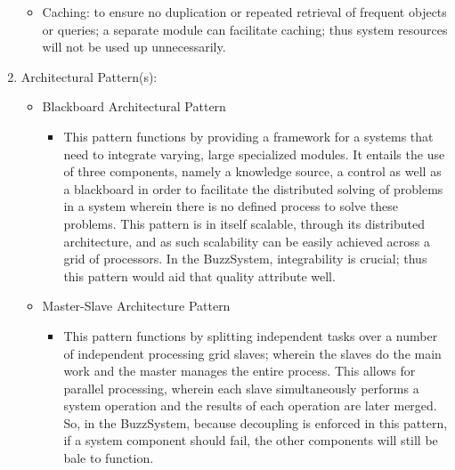 \begin{enumerate}
\begin{itemize}
			\item Caching: to ensure no duplication or repeated retrieval of frequent objects or queries; a separate module can facilitate caching; thus system resources will not be used up unnecessarily.
			 \end{itemize}
			\item Architectural Pattern(s):
			\begin{itemize}
			\item Blackboard Architectural Pattern
				\begin{itemize}
					\item This pattern functions by providing a framework for a systems that need to integrate varying, large specialized modules. It entails the use of three components, namely a knowledge source, a control as well as a blackboard in order to facilitate the distributed solving of problems in a system wherein there is no defined process to solve these problems. This pattern is in itself scalable, through its distributed architecture, and as such scalability can be easily achieved across a grid of processors. In the BuzzSystem, integrability is crucial; thus this pattern would aid that quality attribute well.				
			\end{itemize}
			 \end{itemize}
			 
			 \begin{itemize}
			\item Master-Slave Architecture Pattern
				\begin{itemize}
					\item This pattern functions by splitting independent tasks over a number of independent processing grid slaves; wherein the slaves do the main work and the master manages the entire process. This allows for parallel processing, wherein each slave simultaneously performs a system operation and the results of each operation are later merged. So, in the BuzzSystem, because decoupling is enforced in this pattern, if a system component should fail, the other components will still be bale to function.
				 \end{itemize}
			 \end{itemize} 
		\end{enumerate}
		
